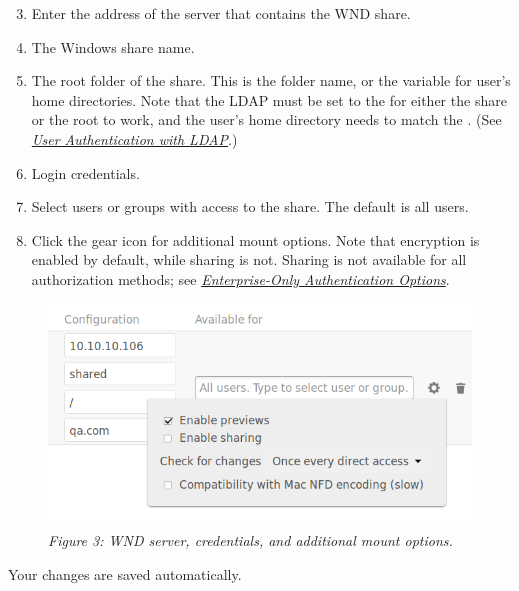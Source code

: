 \documentclass[letterpaper,10pt,english]{sphinxmanual}
\begin{document}
\begin{enumerate}
\setcounter{enumi}{2}
\item {} 
Enter the address of the server that contains the WND share.

\item {} 
The Windows share name.

\item {} 
The root folder of the share. This is the folder name, or the
 variable for user's home directories. Note that the LDAP
 must be set to the  for
either the share or the root to work, and the user's home directory needs
to match the . (See
{\hyperref[configuration_user/user_auth_ldap::doc]{\emph{User Authentication with LDAP}}}.)

\item {} 
Login credentials.

\item {} 
Select users or groups with access to the share. The default is all users.

\item {} 
Click the gear icon for additional mount options. Note that encryption is
enabled by default, while sharing is not. Sharing is not available for all
authorization methods; see {\hyperref[enterprise_external_storage/enterprise_only_auth::doc]{\emph{Enterprise-Only Authentication Options}}}.

\end{enumerate}
\begin{figure}[htbp]
\centering
\capstart

\includegraphics{wnd-3.png}
\caption{\emph{Figure 3: WND server, credentials, and additional mount options.}}\end{figure}

Your changes are saved automatically.
\end{document}
